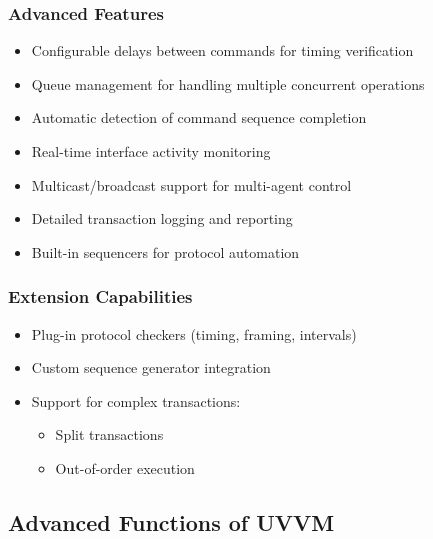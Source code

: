 \documentclass{article}
\begin{document}
\subsubsection*{Advanced Features}
\begin{itemize}
    \item Configurable delays between commands for timing verification
    \item Queue management for handling multiple concurrent operations
    \item Automatic detection of command sequence completion
    \item Real-time interface activity monitoring
    \item Multicast/broadcast support for multi-agent control
    \item Detailed transaction logging and reporting
    \item Built-in sequencers for protocol automation
\end{itemize}

\subsubsection*{Extension Capabilities}
\begin{itemize}
    \item Plug-in protocol checkers (timing, framing, intervals)
    \item Custom sequence generator integration
    \item Support for complex transactions:
    \begin{itemize}
        \item Split transactions
        \item Out-of-order execution
    \end{itemize}
\end{itemize}

\subsection{Advanced Functions of UVVM}
\end{document}
